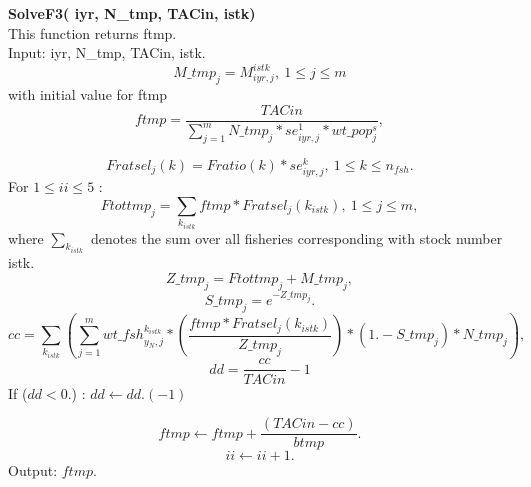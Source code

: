 \documentclass{article}
\begin{document}


\textbf{SolveF3( iyr, N\_tmp,  TACin, istk)}\\
This function returns ftmp.\\
Input:  iyr, N\_tmp,  TACin, istk.
\begin{equation}
    M\_tmp_j=M^{istk}_{iyr,j}, \ 1\leq j \leq m
\end{equation}
with initial value for ftmp
\begin{equation}
    ftmp=\dfrac{TACin}{\sum_{j=1}^mN\_tmp_j*se^1_{iyr,j}*wt\_pop^s_j},
\end{equation}

\begin{equation}
    Fratsel_j(k)=Fratio(k)*se^k_{iyr,j}, \ 1\leq k \leq n_{fsh}.
\end{equation}
For $1 \leq ii \leq 5$ :
\begin{equation}
    Ftottmp_j= \sum_{k_{istk}}ftmp*Fratsel_j(k_{istk}), \ 1\leq j \leq m,
\end{equation}
where $\displaystyle\sum_{k_{istk}}$ denotes the sum over all fisheries corresponding with stock number istk.
\begin{equation}
    Z\_tmp_j=Ftottmp_j+M\_tmp_j,
\end{equation}
\begin{equation}
    S\_tmp_j=e^{-Z\_tmp_j}.
\end{equation}
\begin{equation}
    cc=\sum_{k_{istk}}\left(\sum_{j=1}^m wt\_fsh^{k_{istk}}_{y_N,j}*\left(\dfrac{ftmp*Fratsel_j(k_{istk})}{Z\_tmp_j}\right)*(1.-S\_tmp_j)*N\_tmp_j\right),
\end{equation}
\begin{equation}
    dd=\dfrac{cc}{TACin}-1
\end{equation}
If ($dd<0.$) :   $dd \leftarrow dd . (-1)$

\begin{equation}
    ftmp \leftarrow ftmp + \dfrac{(TACin-cc)}{btmp}.
\end{equation}
\begin{equation}
    ii \leftarrow ii +1.
\end{equation}
Output: $ftmp$.
\end{document}
